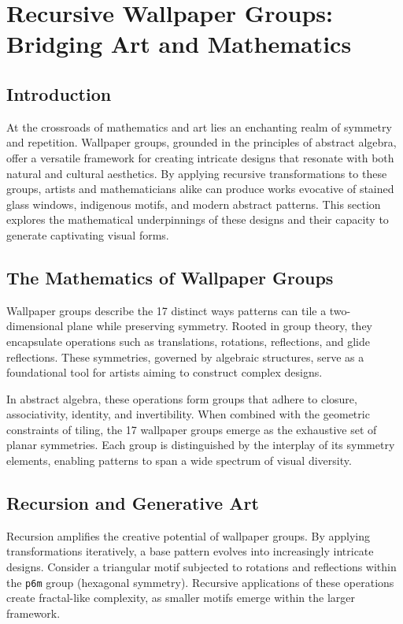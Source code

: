 \section{Recursive Wallpaper Groups: Bridging Art and Mathematics}

\subsection{Introduction}
At the crossroads of mathematics and art lies an enchanting realm of symmetry and repetition. Wallpaper groups, grounded in the principles of abstract algebra, offer a versatile framework for creating intricate designs that resonate with both natural and cultural aesthetics. By applying recursive transformations to these groups, artists and mathematicians alike can produce works evocative of stained glass windows, indigenous motifs, and modern abstract patterns. This section explores the mathematical underpinnings of these designs and their capacity to generate captivating visual forms.

\subsection{The Mathematics of Wallpaper Groups}
Wallpaper groups describe the 17 distinct ways patterns can tile a two-dimensional plane while preserving symmetry. Rooted in group theory, they encapsulate operations such as translations, rotations, reflections, and glide reflections. These symmetries, governed by algebraic structures, serve as a foundational tool for artists aiming to construct complex designs.

In abstract algebra, these operations form groups that adhere to closure, associativity, identity, and invertibility. When combined with the geometric constraints of tiling, the 17 wallpaper groups emerge as the exhaustive set of planar symmetries. Each group is distinguished by the interplay of its symmetry elements, enabling patterns to span a wide spectrum of visual diversity.

\subsection{Recursion and Generative Art}
Recursion amplifies the creative potential of wallpaper groups. By applying transformations iteratively, a base pattern evolves into increasingly intricate designs. Consider a triangular motif subjected to rotations and reflections within the \texttt{p6m} group (hexagonal symmetry). Recursive applications of these operations create fractal-like complexity, as smaller motifs emerge within the larger framework.


